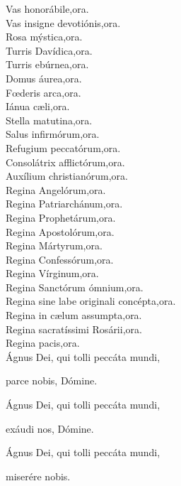 Vas honorábile,\hfill ora.\\
Vas insigne devotiónis,\hfill ora.\\
Rosa mýstica,\hfill ora.\\
Turris Davídica,\hfill ora.\\
Turris ebúrnea,\hfill ora.\\
Domus áurea,\hfill ora.\\
F{\oe}deris arca,\hfill ora.\\
Iánua c{\ae}li,\hfill ora.\\
Stella matutina,\hfill ora.\\
Salus infirmórum,\hfill ora.\\
Refugium peccatórum,\hfill ora.\\
Consolátrix afflictórum,\hfill ora.\\
Auxílium christianórum,\hfill ora.\\
Regina Angelórum,\hfill ora.\\
Regina Patriarchánum,\hfill ora.\\
Regina Prophetárum,\hfill ora.\\
Regina Apostolórum,\hfill ora.\\
Regina Mártyrum,\hfill ora.\\
Regina Confessórum,\hfill ora.\\
Regina Vírginum,\hfill ora.\\
Regina Sanctórum ómnium,\hfill ora.\\
Regina sine labe originali concépta,\hfill ora.\\
Regina in c{\ae}lum assumpta,\hfill ora.\\
Regina sacratíssimi Rosárii,\hfill ora.\\
Regina pacis,\hfill ora.\\
Ágnus Dei, qui tolli peccáta mundi,

\hfill parce nobis, Dómine.

Ágnus Dei, qui tolli peccáta mundi, 

\hfill exáudi nos, Dómine.

Ágnus Dei, qui tolli peccáta mundi, 

\hfill miserére nobis.
